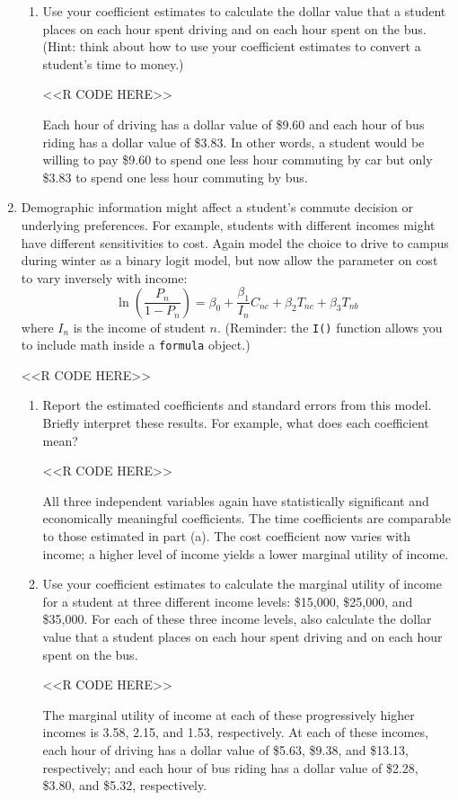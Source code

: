 \documentclass[11pt,letterpaper]{article}
\begin{document}
\begin{enumerate}[label=\alph*., leftmargin=*]
\begin{enumerate}[label=\roman*.]
		\item Use your coefficient estimates to calculate the dollar value that a student places on each hour spent driving and on each hour spent on the bus. (Hint: think about how to use your coefficient estimates to convert a student's time to money.)

		<<R CODE HERE>>

		Each hour of driving has a dollar value of \$9.60 and each hour of bus riding has a dollar value of \$3.83. In other words, a student would be willing to pay \$9.60 to spend one less hour commuting by car but only \$3.83 to spend one less hour commuting by bus.
	\end{enumerate}

	\item Demographic information might affect a student's commute decision or underlying preferences. For example, students with different incomes might have different sensitivities to cost. Again model the choice to drive to campus during winter as a binary logit model, but now allow the parameter on cost to vary inversely with income:
	$$\ln \left( \frac{P_n}{1 - P_n} \right) = \beta_0 + \frac{\beta_1}{I_n} C_{nc} + \beta_2 T_{nc} + \beta_3 T_{nb}$$
	where $I_n$ is the income of student $n$. (Reminder: the \texttt{I()} function allows you to include math inside a \texttt{formula} object.)

	<<R CODE HERE>>

	\begin{enumerate}[label=\roman*.]
		\item Report the estimated coefficients and standard errors from this model. Briefly interpret these results. For example, what does each coefficient mean?

		<<R CODE HERE>>

		All three independent variables again have statistically significant and economically meaningful coefficients. The time coefficients are comparable to those estimated in part (a). The cost coefficient now varies with income; a higher level of income yields a lower marginal utility of income. 

		\item Use your coefficient estimates to calculate the marginal utility of income for a student at three different income levels: \$15,000, \$25,000, and \$35,000. For each of these three income levels, also calculate the dollar value that a student places on each hour spent driving and on each hour spent on the bus.

		<<R CODE HERE>>

		The marginal utility of income at each of these progressively higher incomes is 3.58, 2.15, and 1.53, respectively. At each of these incomes, each hour of driving has a dollar value of \$5.63, \$9.38, and \$13.13, respectively; and each hour of bus riding has a dollar value of \$2.28, \$3.80, and \$5.32, respectively.
	\end{enumerate}
\end{enumerate}
\end{document}
